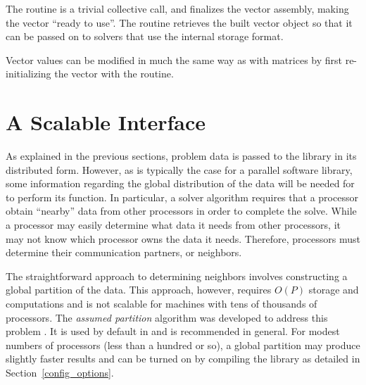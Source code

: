 The  routine is a trivial collective call, and
finalizes the vector assembly, making the vector ``ready to use''.
The  routine retrieves the built vector object so
that it can be passed on to \hypre{} solvers that use the
 internal storage format.

Vector values can be modified in much the same way as with matrices by
first re-initializing the vector with the  routine.



\section{A Scalable Interface}

As explained in the previous sections, problem data is passed to the
\hypre{} library in its distributed form.  However, as is typically
the case for a parallel software library, some information
regarding the global distribution of the data will be needed for
\hypre{} to perform its function.
In particular, a solver algorithm requires that a processor obtain
``nearby'' data from other processors in order to complete the solve.
While a processor may easily determine what data it needs from other
processors, it may not know which processor owns the data it needs.
Therefore, processors must determine their communication partners, or
neighbors.

The straightforward approach to determining neighbors involves constructing a
global partition of the data.  This approach, however, requires $O(P)$ storage
and computations and is not scalable for machines with tens of thousands of
processors.  The {\em assumed partition} algorithm was developed to address this
problem \cite{assumedpartition06}.  It is used by default in \hypre{} and is
recommended in general.  For modest numbers of processors (less than a hundred
or so), a global partition may produce slightly faster results and can be turned
on by compiling the library as detailed in Section~\ref{config_options}.


